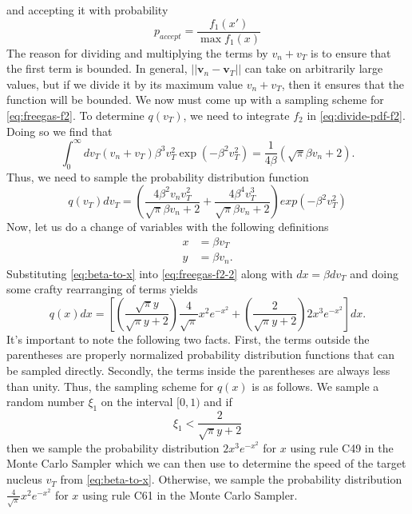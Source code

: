 and accepting it with probability
\begin{equation}
  \label{eq:freegas-accept}
  p_{accept} = \frac{f_1(x')}{\max f_1(x)}
\end{equation}
The reason for dividing and multiplying the terms by $v_n + v_T$ is to ensure
that the first term is bounded. In general, $|| \mathbf{v}_n - \mathbf{v}_T ||$
can take on arbitrarily large values, but if we divide it by its maximum value
$v_n + v_T$, then it ensures that the function will be bounded. We now must come
up with a sampling scheme for \eqref{eq:freegas-f2}. To determine $q(v_T)$, we
need to integrate $f_2$ in \eqref{eq:divide-pdf-f2}. Doing so we find that
\begin{equation}
  \label{eq:integrate-f2}
  \int_0^{\infty} dv_T (v_n + v_T) \beta^3 v_T^2 \exp \left ( -\beta^2 v_T^2
  \right ) = \frac{1}{4\beta} \left ( \sqrt{\pi} \beta v_n + 2 \right ).
\end{equation}
Thus, we need to sample the probability distribution function
\begin{equation}
  \label{eq:freegas-f2-2}
  q(v_T) dv_T = \left ( \frac{4\beta^2 v_n v_T^2}{\sqrt{\pi} \beta v_n + 2} +
  \frac{4\beta^4 v_T^3}{\sqrt{\pi} \beta v_n + 2} \right ) exp \left (
  -\beta^2 v_T^2 \right )
\end{equation}
Now, let us do a change of variables with the following definitions
\begin{equation}
  \label{eq:beta-to-x}
  \begin{split}
    x &= \beta v_T \\
    y &= \beta v_n.
  \end{split}
\end{equation}
Substituting \eqref{eq:beta-to-x} into \eqref{eq:freegas-f2-2} along with $dx =
\beta dv_T$ and doing some crafty rearranging of terms yields
\begin{equation}
  \label{eq:freegas-f2-3}
  q(x) dx = \left [ \left ( \frac{\sqrt{\pi} y}{\sqrt{\pi} y + 2} \right )
    \frac{4}{\sqrt{\pi}} x^2 e^{-x^2} + \left ( \frac{2}{\sqrt{\pi} y + 2}
    \right ) 2x^3 e^{-x^2} \right ] dx.
\end{equation}
It's important to note the following two facts. First, the terms outside the
parentheses are properly normalized probability distribution functions that can
be sampled directly. Secondly, the terms inside the parentheses are always less
than unity. Thus, the sampling scheme for $q(x)$ is as follows. We sample a
random number $\xi_1$ on the interval $[0,1)$ and if
\begin{equation}
  \label{eq:freegas-alpha}
  \xi_1 < \frac{2}{\sqrt{\pi} y + 2}
\end{equation}
then we sample the probability distribution $2x^3 e^{-x^2}$ for $x$ using rule
C49 in the Monte Carlo Sampler \cite{lanl-everett-1983} which we can then use to
determine the speed of the target nucleus $v_T$ from
\eqref{eq:beta-to-x}. Otherwise, we sample the probability distribution
$\frac{4}{\sqrt{\pi}} x^2 e^{-x^2}$ for $x$ using rule C61 in the Monte Carlo
Sampler.

